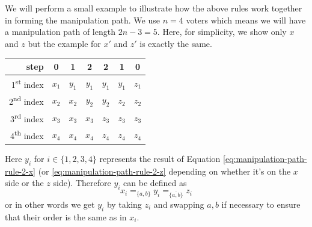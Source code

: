 	We will perform a small example to illustrate how the above rules work together in forming the manipulation path. We use $n = 4$ voters which means we will have a manipulation path of length $2n - 3 = 5$. Here, for simplicity, we show only $x$ and $z$ but the example for $x'$ and $z'$ is exactly the same.
	\begin{center}
		\begin{tabular}{r | c c c c c c}
			step						&	0		&	1		&	2		&	2		&	1		&	0		\\
			\hline
			1\textsuperscript{st} index	&	$x_1$	&	$y_1$	&	$y_1$	&	$y_1$	&	$y_1$	&	$z_1$	\\
			2\textsuperscript{nd} index	&	$x_2$	&	$x_2$	&	$y_2$	&	$y_2$	&	$z_2$	&	$z_2$	\\
			3\textsuperscript{rd} index	&	$x_3$	&	$x_3$	&	$x_3$	&	$z_3$	&	$z_3$	&	$z_3$	\\
			4\textsuperscript{th} index	&	$x_4$	&	$x_4$	&	$x_4$	&	$z_4$	&	$z_4$	&	$z_4$	\\
		\end{tabular}
	\end{center}
	Here $y_i$ for $i \in \{1, 2, 3, 4\}$ represents the result of Equation \ref{eq:manipulation-path-rule-2-x} (or \ref{eq:manipulation-path-rule-2-z} depending on whether it's on the $x$ side or the $z$ side). Therefore $y_i$ can be defined as
	\[
		x_i =_{\{a, b\}} y_i =_{\overline{\{a, b\}}} z_i
	\]
	or in other words we get $y_i$ by taking $z_i$ and swapping $a, b$ if necessary to ensure that their order is the same as in $x_i$.

